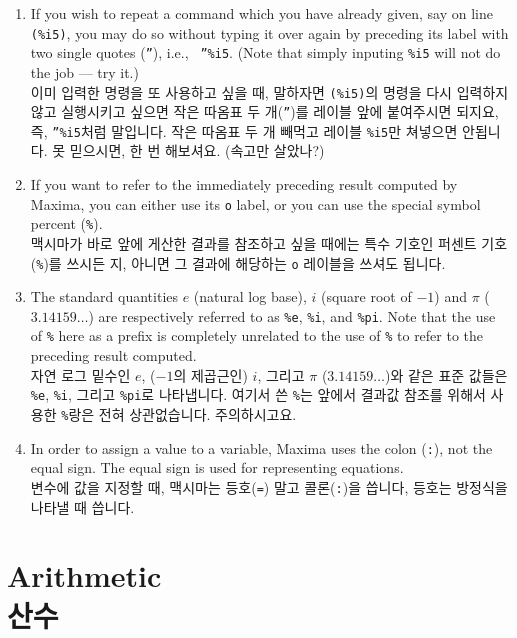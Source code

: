 \documentclass[a4paper,12pt]{article}
\begin{document}
\begin{enumerate}

\item If you wish to repeat a command which you have already given, 
  say on line {\tt (\%i5)}, you may do so without typing it over again 
  by preceding its label with two single quotes ({\tt ''}), i.e., {\tt
   ''\%i5}. (Note that simply inputing {\tt \%i5} will not do the job 
  --- try it.) \\
이미 입력한 명령을 또 사용하고 싶을 때, 말하자면 {\tt (\%i5)}의 명령을 다시 
입력하지 않고 실행시키고 싶으면 작은 따옴표 두 개({\tt ''})를 레이블 앞에 
붙여주시면 되지요, 즉, {\tt ''\%i5}처럼 말입니다. 작은 따옴표 두 개 빼먹고 
레이블 {\tt \%i5}만 쳐넣으면 안됩니다. 못 믿으시면, 한 번 해보셔요. (속고만 살았나?)

\item If you want to refer to the immediately preceding result 
  computed by Maxima, you can either use its {\tt o} label, or you can 
  use the special symbol percent   ({\tt \%}). \\
맥시마가 바로 앞에 게산한 결과를 참조하고 싶을 때에는 특수 기호인 퍼센트 기호 
({\tt \%})를 쓰시든 지, 아니면 그 결과에 해당하는 {\tt o} 레이블을 쓰셔도 됩니다. 

\item The standard quantities $e$ (natural log base), $i$ (square root 
  of $-1$) and $\pi$ ($3.14159\ldots$) are respectively referred to as 
  \verb+%e+, \verb+%i+,
  and \verb+%pi+.  Note that the use of {\tt \%} here as a prefix
  is completely unrelated to the use of {\tt \%} to refer to the 
  preceding result computed. \\
자연 로그 밑수인 $e$, ($-1$의 제곱근인) $i$, 그리고 $\pi$ ($3.14159\ldots$)와 같은 표준 값들은 
\verb+%e+, \verb+%i+, 그리고 \verb+%pi+로 나타냅니다. 여기서 쓴 {\tt \%}는 앞에서 
결과값 참조를 위해서 사용한 {\tt \%}랑은 전혀 상관없습니다. 주의하시고요.

\item In order to assign a value to a variable, Maxima uses the colon 
  ({\tt :}), not the equal sign.  The equal sign is used for 
  representing equations. \\
변수에 값을 지정할 때, 맥시마는 등호({\tt =}) 말고 콜론({\tt :})을 씁니다, 등호는 방정식을 나타낼 때 
씁니다. 
\end{enumerate}

\section{Arithmetic\\산수 \label{sec:arithmetic}}
\end{document}
